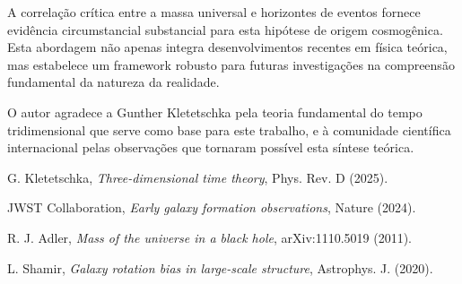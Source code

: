 \documentclass[reprint,amsmath,amssymb,aps,prd]{revtex4-2}
\begin{document}
A correlação crítica entre a massa universal e horizontes de eventos fornece evidência circumstancial substancial para esta hipótese de origem cosmogênica. Esta abordagem não apenas integra desenvolvimentos recentes em física teórica, mas estabelece um framework robusto para futuras investigações na compreensão fundamental da natureza da realidade.

\begin{acknowledgments}
O autor agradece a Gunther Kletetschka pela teoria fundamental do tempo tridimensional que serve como base para este trabalho, e à comunidade científica internacional pelas observações que tornaram possível esta síntese teórica.
\end{acknowledgments}

\begin{thebibliography}{99}

G. Kletetschka, \textit{Three-dimensional time theory}, Phys. Rev. D (2025).

JWST Collaboration, \textit{Early galaxy formation observations}, Nature (2024).

R. J. Adler, \textit{Mass of the universe in a black hole}, arXiv:1110.5019 (2011).

L. Shamir, \textit{Galaxy rotation bias in large-scale structure}, Astrophys. J. (2020).

\end{thebibliography}
\end{document}
